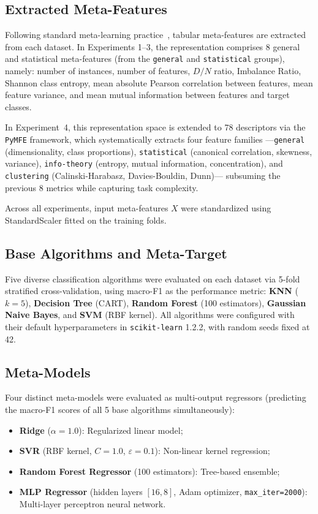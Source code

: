 \documentclass[12pt]{article}
\begin{document}
\subsection{Extracted Meta-Features}

Following standard meta-learning practice~\cite{pymfe2020}, tabular meta-features are extracted from each dataset. In Experiments 1--3, the representation comprises 8 general and statistical meta-features (from the \texttt{general} and \texttt{statistical} groups), namely: number of instances, number of features, $D/N$ ratio, Imbalance Ratio, Shannon class entropy, mean absolute Pearson correlation between features, mean feature variance, and mean mutual information between features and target classes.

In Experiment~4, this representation space is extended to 78 descriptors via the \texttt{PyMFE} framework, which systematically extracts four feature families ---\texttt{general} (dimensionality, class proportions), \texttt{statistical} (canonical correlation, skewness, variance), \texttt{info-theory} (entropy, mutual information, concentration), and \texttt{clustering} (Calinski-Harabasz, Davies-Bouldin, Dunn)--- subsuming the previous 8 metrics while capturing task complexity.

Across all experiments, input meta-features $X$ were standardized using StandardScaler fitted on the training folds.

\subsection{Base Algorithms and Meta-Target}

Five diverse classification algorithms were evaluated on each dataset via 5-fold stratified cross-validation, using macro-F1 as the performance metric: \textbf{KNN} ($k=5$), \textbf{Decision Tree} (CART), \textbf{Random Forest} (100 estimators), \textbf{Gaussian Naive Bayes}, and \textbf{SVM} (RBF kernel). All algorithms were configured with their default hyperparameters in \texttt{scikit-learn} 1.2.2, with random seeds fixed at 42.

\subsection{Meta-Models}

Four distinct meta-models were evaluated as multi-output regressors (predicting the macro-F1 scores of all 5 base algorithms simultaneously):
\begin{itemize}
  \item \textbf{Ridge} ($\alpha = 1.0$): Regularized linear model;
  \item \textbf{SVR} (RBF kernel, $C=1.0$, $\varepsilon=0.1$): Non-linear kernel regression;
  \item \textbf{Random Forest Regressor} (100 estimators): Tree-based ensemble;
  \item \textbf{MLP Regressor} (hidden layers $[16, 8]$, Adam optimizer, \texttt{max\_iter=2000}): Multi-layer perceptron neural network.
\end{itemize}
\end{document}
